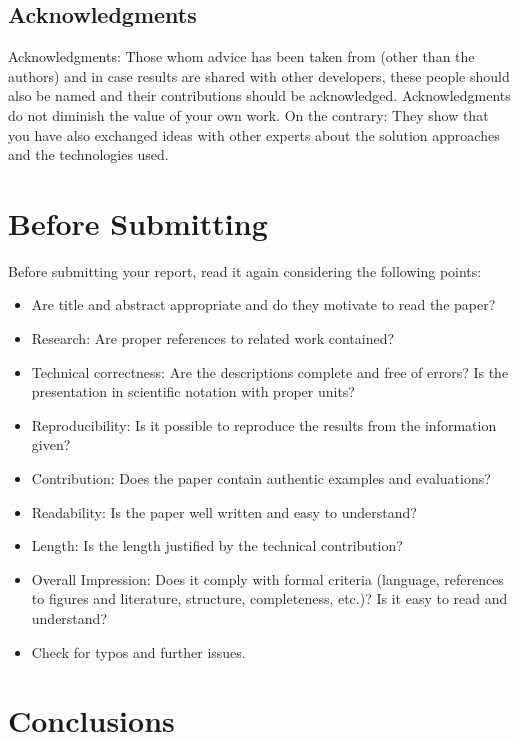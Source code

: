 \documentclass[conference]{IEEEtran}
\begin{document}
\subsection{Acknowledgments}

\noindent Acknowledgments: Those whom advice has been taken from (other than the authors) and in case results are shared with other
developers, these people should also be named and their contributions should be
acknowledged.
Acknowledgments do not diminish the value of your own work. On the contrary: They show that you have also exchanged ideas with other experts about the solution approaches and the technologies used.


\section{Before Submitting}

\noindent Before submitting your report, read it again considering the following points:

\begin{itemize}
\item Are title and abstract appropriate and do they motivate to read the paper?
\item Research: Are proper references to related work contained?
\item Technical correctness: Are the descriptions complete and free of errors? Is the presentation in scientific notation with proper units? 
\item Reproducibility: Is it possible to reproduce the results from the information given?
\item Contribution: Does the paper contain authentic examples and evaluations?
\item Readability: Is the paper well written and easy to understand?
\item Length: Is the length justified by the technical contribution?
\item Overall Impression: Does it comply with formal criteria (language, references to figures and literature, structure, completeness, etc.)? Is it easy to read and understand?
\item Check for typos and further issues.
\end{itemize}

\section{Conclusions}
\end{document}
